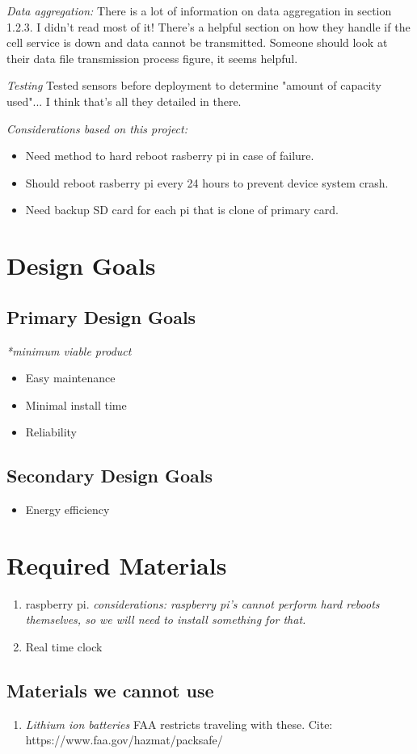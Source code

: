\documentclass[12pt, letterpaper]{article}
\begin{document}
\textit{Data aggregation:} There is a lot of information on data aggregation in section 1.2.3.
%
I didn't read most of it!
%
There's a helpful section on how they handle if the cell service is down and data cannot be transmitted.
%
Someone should look at their data file transmission process figure, it seems helpful.

\textit{Testing} Tested sensors before deployment to determine "amount of capacity used"...
%
I think that's all they detailed in there.


\textit{Considerations based on this project:}
%
\begin{itemize}
%
\item Need method to hard reboot rasberry pi in case of failure.
\item Should reboot rasberry pi every 24 hours to prevent device system crash.
\item Need backup SD card for each pi that is clone of primary card.
%
\end{itemize}


\section{Design Goals}
%
\subsection{Primary Design Goals}
%
\textit{*minimum viable product}
%
\begin{itemize}
%
\item Easy maintenance
%
\item Minimal install time
%
\item Reliability
%
\end{itemize}
%

\subsection{Secondary Design Goals}
%
\begin{itemize}
%
\item Energy efficiency
%
\end{itemize}


\section{Required Materials}
\begin{enumerate}
\item raspberry pi. \textit{considerations: raspberry pi's cannot perform hard reboots themselves,
so we will need to install something for that.}
\item Real time clock
\end{enumerate}

\subsection{Materials we cannot use}
\begin{enumerate}
\item \textit{Lithium ion batteries} FAA restricts traveling with these. Cite: https://www.faa.gov/hazmat/packsafe/
\end{enumerate}
\end{document}
